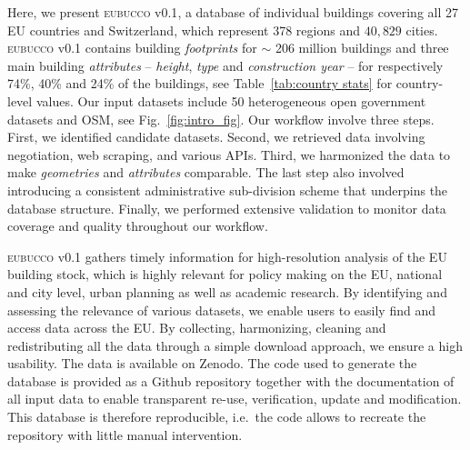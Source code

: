 \documentclass[fleqn,10pt]{wlscirep}
\begin{document}
Here, we present \textsc{eubucco} v0.1\cite{eubucco_v0.1_2022_dataset}, a database of individual buildings covering all 27 EU countries and Switzerland, which represent 378 regions and $40,829$ cities. \textsc{eubucco} v0.1 contains building \textit{footprints} for  $\sim$ 206 million buildings and three main building \textit{attributes} --  \textit{height}, \textit{type} and \textit{construction year} -- for respectively 74\%, 40\% and 24\% of the buildings, see Table~\ref{tab:country stats} for country-level values.
Our input datasets include 50 heterogeneous open government datasets and OSM, see Fig.~\ref{fig:intro_fig}. 
Our workflow involve three steps. First, we identified candidate datasets. Second, we retrieved data involving negotiation, web scraping, and various APIs. Third, we harmonized the data to make \textit{geometries} and \textit{attributes} comparable. The last step also involved introducing a consistent administrative sub-division scheme that underpins the database structure.
Finally, we performed extensive validation to monitor data coverage and quality throughout our workflow.

\textsc{eubucco} v0.1 gathers timely information for high-resolution analysis of the EU building stock, which is highly relevant for policy making on the EU, national and city level, urban planning as well as academic research. By identifying and assessing the relevance of various datasets, we enable users to easily find and access data across the EU. By collecting, harmonizing, cleaning and redistributing all the data through a simple download approach, we ensure a high usability. The data is available on Zenodo\cite{eubucco_v0.1_2022_dataset}. The code used to generate the database is provided as a Github repository\cite{eubucco-0.1-code2022} together with the documentation of all input data to enable transparent re-use, verification, update and modification. This database is therefore reproducible, i.e.\ the code allows to recreate the repository with little manual intervention.
\end{document}
